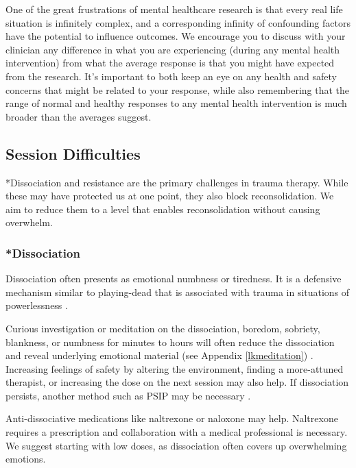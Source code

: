 \documentclass[12pt,letterpaper]{article}
\begin{document}
One of the great frustrations of mental healthcare research is that every real life situation is infinitely complex, and a corresponding infinity of confounding factors have the potential to influence outcomes. We encourage you to discuss with your clinician any difference in what you are experiencing (during any mental health intervention) from what the average response is that you might have expected from the research. It's important to both keep an eye on any health and safety concerns that might be related to your response, while also remembering that the range of normal and healthy responses to any mental health intervention is much broader than the averages suggest.
\subsection{Session Difficulties}
\label{sec:dissociationandresistance}
*Dissociation and resistance are the primary challenges in trauma therapy. While these may have protected us at one point, they also block reconsolidation. We aim to reduce them to a level that enables reconsolidation without causing overwhelm.

\subsubsection{*Dissociation}

Dissociation often presents as emotional numbness or tiredness. It is a defensive mechanism similar to playing-dead that is associated with trauma in situations of powerlessness \cite{loewensteinDissociation}.

Curious investigation or meditation on the dissociation, boredom, sobriety, blankness, or numbness for minutes to hours will often reduce the dissociation and reveal underlying emotional material (see Appendix \ref{lkmeditation}) \cite{razviPSIP}.  Increasing feelings of safety by altering the environment, finding a more-attuned therapist, or increasing the dose on the next session may also help. If dissociation persists, another method such as PSIP may be necessary \cite{razviPSIP}.

Anti-dissociative medications like naltrexone or naloxone may help. Naltrexone requires a prescription and collaboration with a medical professional is necessary. We suggest starting with low doses, as dissociation often covers up overwhelming emotions. 
\end{document}

